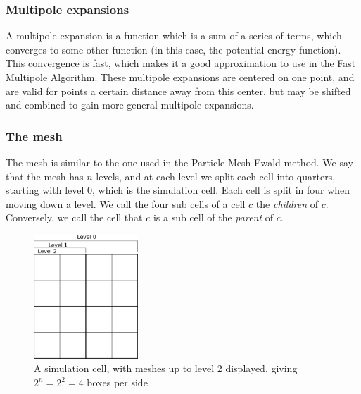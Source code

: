 \documentclass[pdftex,twoside,a4paper]{report}
\newcommand{\bcen}{\begin{center}}
\newcommand{\ecen}{\end{center}}
\newcommand{\pmem}{Particle Mesh Ewald method}
\newcommand{\fma}{Fast Multipole Algorithm}
\begin{document}
\subsubsection{Multipole expansions}
A multipole expansion is a function which is a sum of a series of terms, which converges to some other function (in this case, the potential energy function). This convergence is fast, which makes it a good approximation to use in the \fma{}. These multipole expansions are centered on one point, and are valid for points a certain distance away from this center, but may be shifted and combined to gain more general multipole expansions. \cite{greengard:315}

\subsubsection{The mesh}
The mesh is similar to the one used in the \pmem{}. We say that the mesh has $n$ levels, and at each level we split each cell into quarters, starting with level $0$, which is the simulation cell. Each cell is split in four when moving down a level. We call the four sub cells of a cell $c$ the \emph{children} of $c$. Conversely, we call the cell that $c$ is a sub cell of the \emph{parent} of $c$.
\begin{figure}[H]
\bcen \includegraphics[width=0.35\textwidth]{figures/fma_mesh.pdf} \ecen
\caption{A simulation cell, with meshes up to level 2 displayed, giving $2^n = 2^2 = 4$ boxes per side}
\end{figure}
\end{document}
